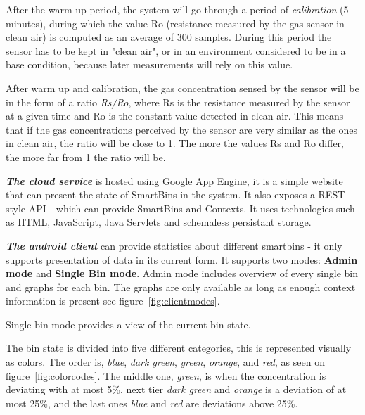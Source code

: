 After the warm-up period, the system will go through a period of \textit{calibration} (5 minutes), during which the value Ro (resistance measured by the gas sensor in clean air) is computed as an average of 300 samples.
During this period the sensor has to be kept in "clean air", or  in an environment considered to be in a base condition, because later measurements will rely on this value.

After warm up and calibration, the gas concentration sensed by the sensor will be in the form of a ratio \textit{Rs/Ro}, where Rs is the resistance measured by the sensor at a given time and Ro is the constant value detected in clean air.
This means that if the gas concentrations perceived by the sensor are very similar as the ones in clean air, the ratio will be close to 1.
The more the values Rs and Ro differ, the more far from 1 the ratio will be.

\textit{\textbf{The cloud service}} is hosted using Google App Engine, it is a simple website that can present the state of SmartBins in the system. It also exposes a REST style API - which can provide SmartBins and Contexts.
It uses technologies such as HTML, JavaScript, Java Servlets and schemaless persistant storage.

\textit{\textbf{The android client}} can provide statistics about different smartbins - it only supports  presentation of data in its current form.
It supports two modes: \textbf{Admin mode} and \textbf{Single Bin mode}.
Admin mode includes overview of every single bin and graphs for each bin. The graphs are only available as long as enough context information is present see figure~\ref{fig:clientmodes}.

 Single bin mode provides a view of the current bin state.
 
 The bin state is divided into five different categories, this is represented visually as colors.
 The order is, \textit{blue}, \textit{dark green}, \textit{green}, \textit{orange}, and \textit{red}, as seen on figure~\ref{fig:colorcodes}.
The middle one, \textit{green}, is when the concentration is deviating with at most 5\%, next tier \textit{dark green} and \textit{orange} is a deviation of at most 25\%, and the last ones \textit{blue} and \textit{red} are deviations above 25\%.

